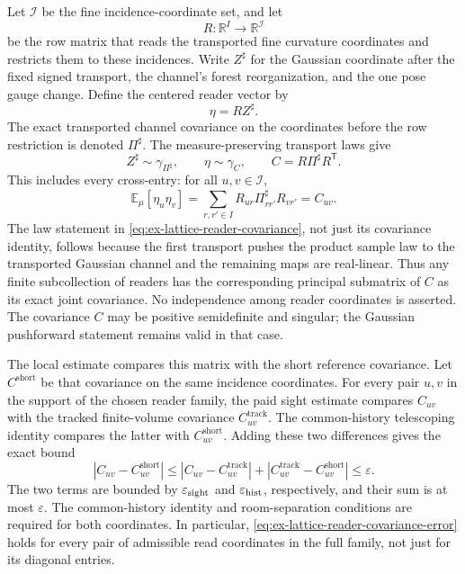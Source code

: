 Let $\mathcal I$ be the fine incidence-coordinate set, and let
\[
 R:\mathbb R^I\longrightarrow\mathbb R^{\mathcal I}
\]
be the row matrix that reads the transported fine curvature coordinates
and restricts them to these incidences. Write $Z^\sharp$ for the Gaussian
coordinate after the fixed signed transport, the channel's forest
reorganization, and the one pose gauge change. Define the centered reader
vector by
\begin{equation}\label{eq:ex-lattice-reader-transverse}
 \eta=RZ^\sharp.
\end{equation}
The exact transported channel covariance on the coordinates before the row
restriction is denoted $\Pi^\sharp$. The measure-preserving transport laws
give
\begin{equation}
 Z^\sharp\sim\gamma_{\Pi^\sharp},\qquad
 \eta\sim\gamma_C,\qquad
 C=R\Pi^\sharp R^{\mathsf T}.
 \label{eq:ex-lattice-reader-covariance}
\end{equation}
This includes every cross-entry: for all $u,v\in\mathcal I$,
\[
 \mathbb E_\mu[\eta_u\eta_v]
   =\sum_{r,r'\in I}R_{ur}\Pi^\sharp_{rr'}R_{vr'}=C_{uv}.
\]
The law statement in \eqref{eq:ex-lattice-reader-covariance}, not just its covariance identity, follows because
the first transport pushes the product sample law to the transported
Gaussian channel and the remaining maps are real-linear. Thus any finite
subcollection of readers has the corresponding principal submatrix of
$C$ as its exact joint covariance. No independence among reader
coordinates is asserted. The covariance $C$ may be positive semidefinite
and singular; the Gaussian pushforward statement remains valid in that
case.

The local estimate compares this matrix with the short reference
covariance. Let $C^{\mathrm{short}}$ be that covariance on the same
incidence coordinates. For every pair $u,v$ in the support of the chosen
reader family, the paid sight estimate compares $C_{uv}$ with the tracked
finite-volume covariance $C^{\mathrm{track}}_{uv}$. The common-history
telescoping identity compares the latter with $C^{\mathrm{short}}_{uv}$.
Adding these two differences gives the exact bound
\begin{equation}\label{eq:ex-lattice-reader-covariance-error}
 |C_{uv}-C^{\mathrm{short}}_{uv}|
 \le |C_{uv}-C^{\mathrm{track}}_{uv}|
       +|C^{\mathrm{track}}_{uv}-C^{\mathrm{short}}_{uv}|
 \le \varepsilon.
\end{equation}
The two terms are bounded by $\varepsilon_{\rm sight}$ and
$\varepsilon_{\rm hist}$, respectively, and their sum is at most
$\varepsilon$. The common-history identity and room-separation conditions
are required for both coordinates. In particular, \eqref{eq:ex-lattice-reader-covariance-error} holds for every pair
of admissible read coordinates in the full family, not just for its
diagonal entries.

